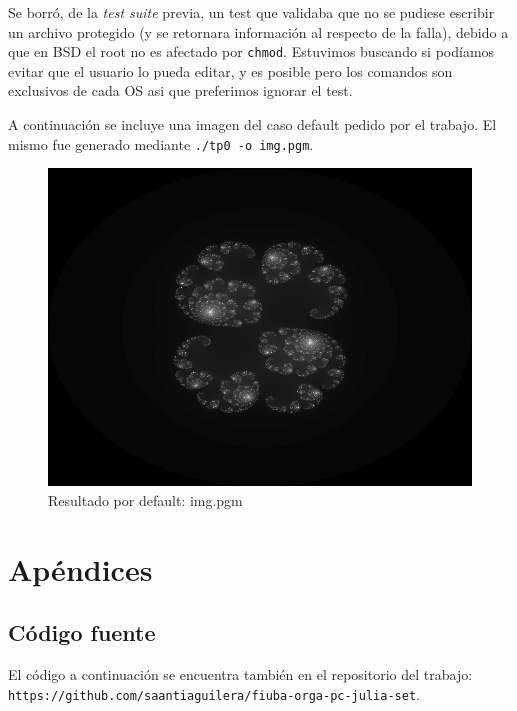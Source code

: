 \documentclass[10pt,a4paper]{article}
\begin{document}
Se borró, de la \textit{test suite} previa, un test que validaba que no se pudiese escribir un archivo protegido (y se retornara información al respecto de la falla), debido a que en BSD el root no es afectado por \texttt{chmod}. Estuvimos buscando si podíamos evitar que el usuario lo pueda editar, y es posible pero los comandos son exclusivos de cada OS asi que preferimos ignorar el test.

A continuación se incluye una imagen del caso default pedido por el trabajo. El mismo fue generado mediante \texttt{./tp0 -o img.pgm}.

\begin{figure}[H]
\centering
\includegraphics[width=\columnwidth]{juli.png}
\caption{Resultado por default: img.pgm}
\end{figure}

\section{Apéndices}

\subsection{Código fuente}
El código a continuación se encuentra también en el repositorio del trabajo: \\
\texttt{https://github.com/saantiaguilera/fiuba-orga-pc-julia-set}.\\






\end{document}
